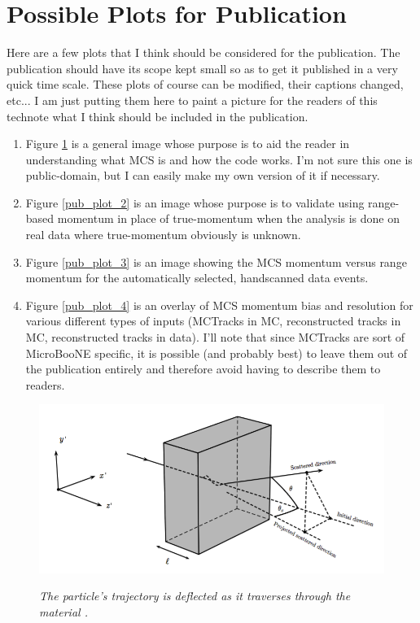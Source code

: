 \section{Possible Plots for Publication}\label{publicplots_section}
Here are a few plots that I think should be considered for the publication. The publication should have its scope kept small so as to get it published in a very quick time scale. These plots of course can be modified, their captions changed, etc... I am just putting them here to paint a picture for the readers of this technote what I think should be included in the publication.
\begin{enumerate}
	\item Figure \ref{pub_plot_1} is a general image whose purpose is to aid the reader in understanding what MCS is and how the code works. I'm not sure this one is public-domain, but I can easily make my own version of it if necessary.
	\item Figure \ref{pub_plot_2} is an image whose purpose is to validate using range-based momentum in place of true-momentum when the analysis is done on real data where true-momentum obviously is unknown.
	\item Figure \ref{pub_plot_3} is an image showing the MCS momentum versus range momentum for the automatically selected, handscanned data events.
	\item Figure \ref{pub_plot_4} is an overlay of MCS momentum bias and resolution for various different types of inputs ({\sc MCTracks} in MC, reconstructed tracks in MC, reconstructed tracks in data). I'll note that since {\sc MCTracks} are sort of MicroBooNE specific, it is possible (and probably best) to leave them out of the publication entirely and therefore avoid having to describe them to readers.
\end{enumerate}

\begin{figure}[ht!]
\centering
	\includegraphics[width=0.5\linewidth]{Figures/static_figs/mcs_nocap.png} \\
\caption{\textit{The particle's trajectory is deflected as it traverses through the material \cite{leonidas1}.}}\label{pub_plot_1}
\end{figure}

